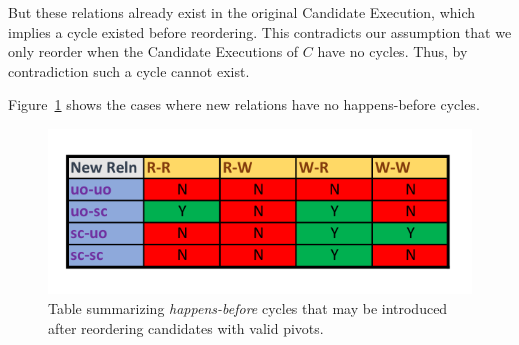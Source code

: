     But these relations already exist in the original Candidate Execution, which implies a cycle existed before reordering. This contradicts our assumption that we only reorder when the Candidate Executions of $C$ have no cycles. Thus, by contradiction such a cycle cannot exist.

    Figure~\ref{reord:cycle_table} shows the cases where new relations have no happens-before cycles. 
    \begin{figure}[H]
        \centering
        \includegraphics[scale=0.7]{5.InstructionReordering/4.ValidReorderingCandidate/ProofParts/Part3/part3_table.pdf}
        \caption{Table summarizing \textit{happens-before} cycles that may be introduced after reordering candidates with valid pivots.}
        \label{reord:cycle_table}
    \end{figure}